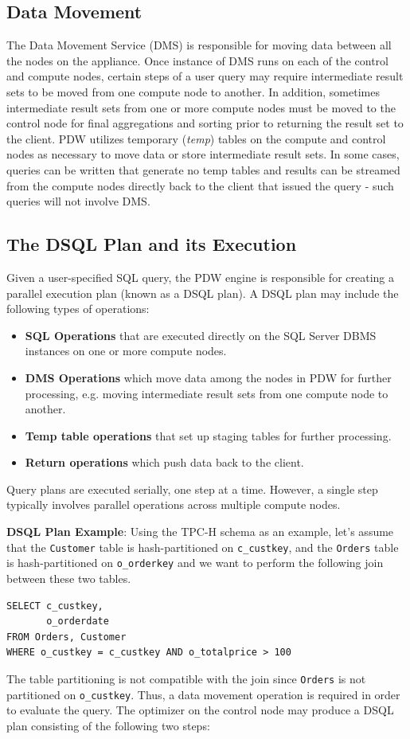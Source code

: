 \documentclass[11pt]{article}
\begin{document}
\subsection{Data Movement}
\label{sec:org5f5732d}
The Data Movement Service (DMS) is responsible for moving data between all the nodes on the appliance.
Once instance of DMS runs on each of the control and compute nodes, certain steps of a user query may
require intermediate result sets to be moved from one compute node to another. In addition, sometimes
intermediate result sets from one or more compute nodes must be moved to the control node for final
aggregations and sorting prior to returning the result set to the client. PDW utilizes temporary
(\emph{temp}) tables on the compute and control nodes as necessary to move data or store intermediate result
sets. In some cases, queries can be written that generate no temp tables and results can be streamed
from the compute nodes directly back to the client that issued the query - such queries will not involve DMS.
\subsection{The DSQL Plan and its Execution}
\label{sec:orgd3707c4}
Given a user-specified SQL query, the PDW engine is responsible for creating a parallel execution plan
(known as a DSQL plan). A DSQL plan may include the following types of operations:
\begin{itemize}
\item \textbf{SQL Operations} that are executed directly on the SQL Server DBMS instances on one or more compute nodes.
\item \textbf{DMS Operations} which move data among the nodes in PDW for further processing, e.g. moving
intermediate result sets from one compute node to another.
\item \textbf{Temp table operations} that set up staging tables for further processing.
\item \textbf{Return operations} which push data back to the client.
\end{itemize}

Query plans are executed serially, one step at a time. However, a single step typically involves
parallel operations across multiple compute nodes.

\textbf{DSQL Plan Example}: Using the TPC-H schema as an example, let’s assume that the \texttt{Customer} table is
hash-partitioned on \texttt{c\_custkey}, and the \texttt{Orders} table is hash-partitioned on \texttt{o\_orderkey} and we want to
perform the following join between these two tables.
\begin{verbatim}
SELECT c_custkey,
       o_orderdate
FROM Orders, Customer
WHERE o_custkey = c_custkey AND o_totalprice > 100
\end{verbatim}
The table partitioning is not compatible with the join since \texttt{Orders} is not partitioned on \texttt{o\_custkey}.
Thus, a data movement operation is required in order to evaluate the query. The optimizer on the
control node may produce a DSQL plan consisting of the following two steps:
\end{document}
